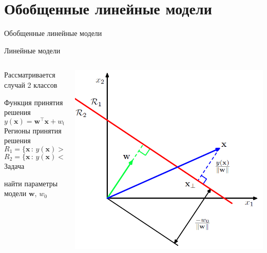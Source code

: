 \documentclass[10pt]{beamer}
\begin{document}

\section{Обобщенные линейные модели}


\begin{frame}{}

\begin{center}
\Large Обобщенные линейные модели
\end{center}

\end{frame}

\begin{frame}{Линейные модели}

\begin{columns}[T]
    \begin{column}{.5\textwidth}
	Рассматривается случай 2 классов
	\vspace{0.3em} 
    
    Функция принятия решения
    \[
    y(\mathbf{x}) = \mathbf{w}^\top \mathbf{x} + w_0
    \]
    Регионы принятия решения
    \[
    R_1 = \{\mathbf{x}\,:\,y(\mathbf{x}) > 0\}
    \]
    \[
    R_2 = \{\mathbf{x}\,:\,y(\mathbf{x}) < 0\}
    \]
    Задача
    
    найти параметры модели $\mathbf{w}$, $w_0$
    \end{column}
       
    \begin{column}{.5\textwidth}
    \vspace{-0em}
	\begin{center}
   		\includegraphics[scale=0.3]{images/linear.png}
    \end{center}
    \end{column}
  \end{columns}

\end{frame}
\end{document}

